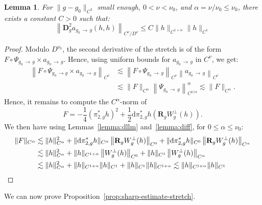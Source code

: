\documentclass[10pt]{amsart}
\newtheorem{lemm}[theo]{Lemma}\newtheorem{prop}[theo]{Proposition}\newtheorem{coro}[theo]{Corollary}\newtheorem{conj}[theo]{Conjecture}
\theoremstyle{definition}\newtheorem{defi}[theo]{Definition}\newtheorem{rema}[theo]{Remark}\newtheorem{exam}[theo]{Example}\newtheorem{exem}[theo]{Example}\newtheorem{nota}[theo]{Notation}
\newcommand{\RR}{\mathbf{R}}
\newcommand{\bdD}{\mathbf{D}}
\newcommand{\dd}{\mathrm{d}}
\begin{document}
\begin{lemm}\label{lemma:norme}
For $\| g-g_0\|_{C^3}$ small enough, $0<\nu < \nu_0$, and $\alpha = \nu/\nu_0 \leq \nu_0$, there exists a constant $C > 0$ such that:
\[
\left\|\bdD^2_g a_{g_0\,\to\,g} (h,h)\right\|_{C^{\nu}/D^\nu} \leq C \|h\|_{C^{1+\alpha}}\|h\|_{C^1}
\]
\end{lemm}


\begin{proof}
Modulo $D^{\nu_0}$, the second derivative of the stretch is of the form $F \circ \Psi_{g_0\,\to \,g} \times a_{g_0\,\to\,g}$. Hence, using uniform bounds for $a_{g_0\,\to\,g}$ in $C^{\nu}$, we get:
\begin{align*}
\left\|F \circ \Psi_{g_0\,\to g} \times a_{g_0 \,\to\,g}\right\|_{C^{\nu}} &\lesssim \left\|F \circ \Psi_{g_0\,\to\,g}\right\|_{C^{\nu}} \left\|a_{g_0\,\to\,g}\right\|_{C^{\nu}}\\
 &\lesssim \|F\|_{C^{\alpha}} \left\|\Psi_{g_0\,\to\,g}\right\|_{C^{\nu/\alpha}}^{\alpha} \lesssim \|F\|_{C^{\alpha}}.
\end{align*}
Hence, it remains to compute the $C^{\alpha}$-norm of
\[
F = -\frac{1}{4} \left(\pi_{2,g}^\ast h\right)^2 + \frac{1}{2} \dd \pi_{2,g}^\ast h\left(\RR_g W^\bot_g(h) \right).
\]
We then have using Lemmas~\ref{lemma:dllm} and~\ref{lemma:diff}, for $0\leq\alpha\leq \nu_0$:
\begin{align*}
\|F\|_{C^{\alpha}}& \lesssim \|h\|_{C^{\alpha}}^2 + \|\dd \pi_{2,g}^\ast h\|_{C^{\alpha}} \left\|\RR_g W^\bot_g(h)\right\|_{C^{0}} + \|\dd \pi_{2,g}^\ast h\|_{C^{0}} \left\|\RR_g W^\bot_g(h)\right\|_{C^{\alpha}} \\
& \lesssim \|h\|_{C^{\alpha}}^2 + \|h\|_{C^{1+\alpha}} \left\|W^\bot_g(h)\right\|_{C^{0}} + \|h\|_{C^1} \left\|W^\bot_g(h)\right\|_{C^{\alpha}} \\
& \lesssim \|h\|_{C^{\alpha}}^2 + \|h\|_{C^{1+\alpha}} \|h\|_{C^{1}} + \|h\|_{C^1} \|h\|_{C^{1+\alpha}} \lesssim \|h\|_{C^{1+\alpha}}\|h\|_{C^1}\qedhere
\end{align*}
\end{proof}

We can now prove Proposition~\ref{prop:sharp-estimate-stretch}.
\end{document}
